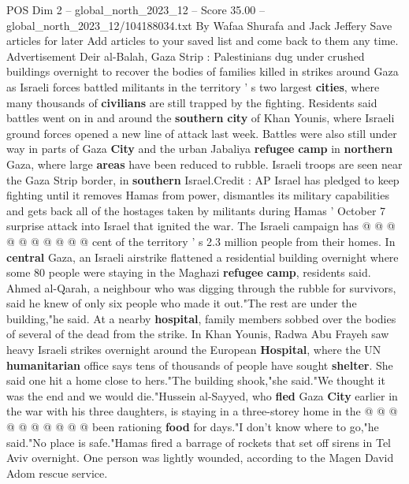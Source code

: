 \begin{textsample}{POS Dim 2 – global\_north\_2023\_12 – Score 35.00 – global\_north\_2023\_12/104188034.txt}  \label{ex:f2_pos_114}
By Wafaa Shurafa and Jack Jeffery Save articles for later Add articles to your saved list and come back to them any time.
Advertisement Deir al-Balah, Gaza Strip : Palestinians dug under crushed buildings overnight to recover the bodies of families killed in strikes around Gaza as Israeli forces battled militants in the territory ' s two largest \textbf{cities}, where many thousands of \textbf{civilians} are still trapped by the fighting.
Residents said battles went on in and around the \textbf{southern} \textbf{city} of Khan Younis, where Israeli ground forces opened a new line of attack last week.
Battles were also still under way in parts of Gaza \textbf{City} and the urban Jabaliya \textbf{refugee} \textbf{camp} in \textbf{northern} Gaza, where large \textbf{areas} have been reduced to rubble.
Israeli troops are seen near the Gaza Strip border, in \textbf{southern} Israel.Credit : AP Israel has pledged to keep fighting until it removes Hamas from power, dismantles its military capabilities and gets back all of the hostages taken by militants during Hamas ' October 7 surprise attack into Israel that ignited the war.
The Israeli campaign has @ @ @ @ @ @ @ @ @ @ cent of the territory ' s 2.3 million people from their homes.
In \textbf{central} Gaza, an Israeli airstrike flattened a residential building overnight where some 80 people were staying in the Maghazi \textbf{refugee} \textbf{camp}, residents said.
Ahmed al-Qarah, a neighbour who was digging through the rubble for survivors, said he knew of only six people who made it out."The rest are under the building,"he said.
At a nearby \textbf{hospital}, family members sobbed over the bodies of several of the dead from the strike.
In Khan Younis, Radwa Abu Frayeh saw heavy Israeli strikes overnight around the European \textbf{Hospital}, where the UN \textbf{humanitarian} office says tens of thousands of people have sought \textbf{shelter}.
She said one hit a home close to hers."The building shook,"she said."We thought it was the end and we would die."Hussein al-Sayyed, who \textbf{fled} Gaza \textbf{City} earlier in the war with his three daughters, is staying in a three-storey home in the @ @ @ @ @ @ @ @ @ @ been rationing \textbf{food} for days."I don't know where to go,"he said."No place is safe."Hamas fired a barrage of rockets that set off sirens in Tel Aviv overnight.
One person was lightly wounded, according to the Magen David Adom rescue service.

\end{textsample}
